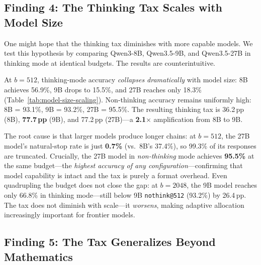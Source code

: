 \subsection{Finding 4: The Thinking Tax Scales with Model Size}
\label{sec:finding:model-size}

One might hope that the thinking tax diminishes with more capable models.
We test this hypothesis by comparing Qwen3-8B, Qwen3.5-9B, and
Qwen3.5-27B in thinking mode at identical budgets.
The results are counterintuitive.



At $b{=}512$, thinking-mode accuracy \emph{collapses dramatically}
with model size: 8B achieves 56.9\%, 9B drops to 15.5\%, and 27B
reaches only 18.3\% (Table~\ref{tab:model-size-scaling}).
Non-thinking accuracy remains uniformly high: 8B = 93.1\%, 9B = 93.2\%, 27B = 95.5\%.
The resulting thinking tax is 36.2\,pp (8B), \textbf{77.7\,pp} (9B), and 77.2\,pp (27B)---a \textbf{2.1$\times$} amplification from 8B to 9B.

The root cause is that larger models produce longer chains: at $b{=}512$, the 27B model's natural-stop rate is just \textbf{0.7\%} (vs.\ 8B's 37.4\%), so 99.3\% of its responses are truncated.
Crucially, the 27B model in \emph{non-thinking} mode achieves \textbf{95.5\%} at the same budget---the \emph{highest accuracy of any configuration}---confirming that model capability is intact and the tax is purely a format overhead.
Even quadrupling the budget does not close the gap: at $b{=}2048$, the 9B model reaches only 66.8\% in thinking mode---still below 9B \texttt{nothink@512} (93.2\%) by 26.4\,pp.
The tax does not diminish with scale---it \emph{worsens}, making adaptive allocation increasingly important for frontier models.


\subsection{Finding 5: The Tax Generalizes Beyond Mathematics}
\label{sec:finding:bbh}

